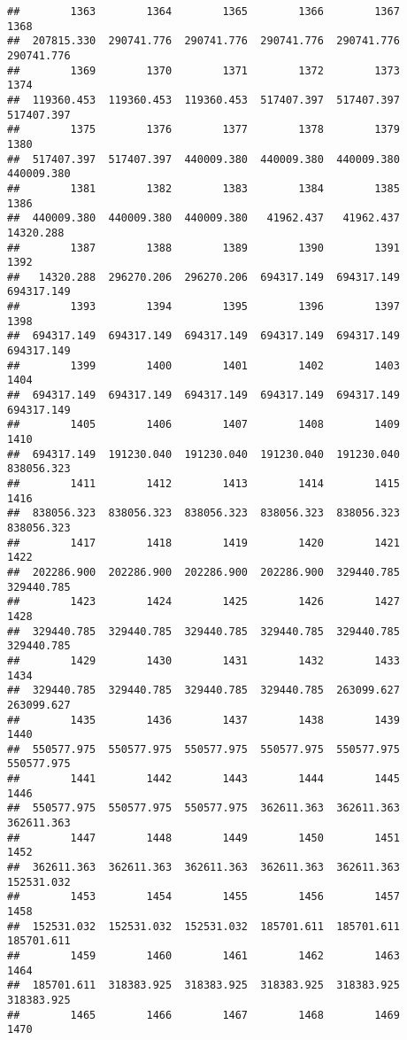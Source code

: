 \documentclass[
]{book}
\begin{document}
\begin{verbatim}
##        1363        1364        1365        1366        1367        1368 
##  207815.330  290741.776  290741.776  290741.776  290741.776  290741.776 
##        1369        1370        1371        1372        1373        1374 
##  119360.453  119360.453  119360.453  517407.397  517407.397  517407.397 
##        1375        1376        1377        1378        1379        1380 
##  517407.397  517407.397  440009.380  440009.380  440009.380  440009.380 
##        1381        1382        1383        1384        1385        1386 
##  440009.380  440009.380  440009.380   41962.437   41962.437   14320.288 
##        1387        1388        1389        1390        1391        1392 
##   14320.288  296270.206  296270.206  694317.149  694317.149  694317.149 
##        1393        1394        1395        1396        1397        1398 
##  694317.149  694317.149  694317.149  694317.149  694317.149  694317.149 
##        1399        1400        1401        1402        1403        1404 
##  694317.149  694317.149  694317.149  694317.149  694317.149  694317.149 
##        1405        1406        1407        1408        1409        1410 
##  694317.149  191230.040  191230.040  191230.040  191230.040  838056.323 
##        1411        1412        1413        1414        1415        1416 
##  838056.323  838056.323  838056.323  838056.323  838056.323  838056.323 
##        1417        1418        1419        1420        1421        1422 
##  202286.900  202286.900  202286.900  202286.900  329440.785  329440.785 
##        1423        1424        1425        1426        1427        1428 
##  329440.785  329440.785  329440.785  329440.785  329440.785  329440.785 
##        1429        1430        1431        1432        1433        1434 
##  329440.785  329440.785  329440.785  329440.785  263099.627  263099.627 
##        1435        1436        1437        1438        1439        1440 
##  550577.975  550577.975  550577.975  550577.975  550577.975  550577.975 
##        1441        1442        1443        1444        1445        1446 
##  550577.975  550577.975  550577.975  362611.363  362611.363  362611.363 
##        1447        1448        1449        1450        1451        1452 
##  362611.363  362611.363  362611.363  362611.363  362611.363  152531.032 
##        1453        1454        1455        1456        1457        1458 
##  152531.032  152531.032  152531.032  185701.611  185701.611  185701.611 
##        1459        1460        1461        1462        1463        1464 
##  185701.611  318383.925  318383.925  318383.925  318383.925  318383.925 
##        1465        1466        1467        1468        1469        1470 

\end{verbatim}
\end{document}
